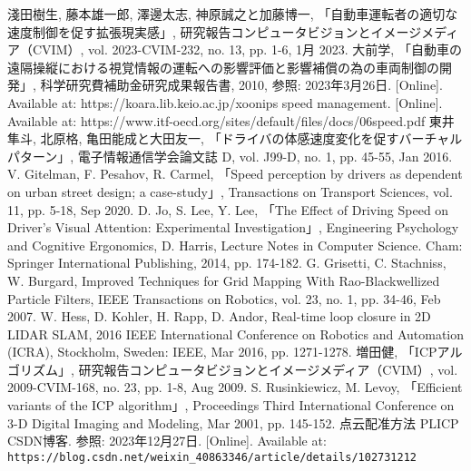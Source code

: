 \documentclass[a4paper,12pt]{jreport}
\begin{document}
\begin{thebibliography}{99}
   淺田樹生, 藤本雄一郎, 澤邊太志, 神原誠之と加藤博一, 「自動車運転者の適切な速度制御を促す拡張現実感」, 研究報告コンピュータビジョンとイメージメディア（CVIM）, vol. 2023-CVIM-232, no. 13, pp. 1-6, 1月 2023.
   大前学, 「自動車の遠隔操縦における視覚情報の運転への影響評価と影響補償の為の車両制御の開発」, 科学研究費補助金研究成果報告書, 2010, 参照: 2023年3月26日. [Online]. Available at: https://koara.lib.keio.ac.jp/xoonips
   speed management. [Online]. Available at: https://www.itf-oecd.org/sites/default/files/docs/06speed.pdf
   東井隼斗, 北原格, 亀田能成と大田友一, 「ドライバの体感速度変化を促すバーチャルパターン」, 電子情報通信学会論文誌 D, vol. J99-D, no. 1, pp. 45-55, Jan 2016.
   V. Gitelman, F. Pesahov, R. Carmel, 「Speed perception by drivers as dependent on urban street design; a case-study」, Transactions on Transport Sciences, vol. 11, pp. 5-18, Sep 2020.
  D. Jo, S. Lee, Y. Lee, 「The Effect of Driving Speed on Driver's Visual Attention: Experimental Investigation」, Engineering Psychology and Cognitive Ergonomics, D. Harris, Lecture Notes in Computer Science. Cham: Springer International Publishing, 2014, pp. 174-182.
  G. Grisetti, C. Stachniss, W. Burgard,  Improved Techniques for Grid Mapping With Rao-Blackwellized Particle Filters, IEEE Transactions on Robotics, vol. 23, no. 1, pp. 34-46, Feb 2007.
  W. Hess, D. Kohler, H. Rapp, D. Andor, Real-time loop closure in 2D LIDAR SLAM, 2016 IEEE International Conference on Robotics and Automation (ICRA), Stockholm, Sweden: IEEE, Mar 2016, pp. 1271-1278.
  増田健, 「ICPアルゴリズム」, 研究報告コンピュータビジョンとイメージメディア（CVIM）, vol. 2009-CVIM-168, no. 23, pp. 1-8, Aug 2009.
  S. Rusinkiewicz, M. Levoy, 「Efficient variants of the ICP algorithm」, Proceedings Third International Conference on 3-D Digital Imaging and Modeling, Mar 2001, pp. 145-152.
  点云配准方法 PLICP CSDN博客. 参照: 2023年12月27日. [Online]. Available at: \verb|https://blog.csdn.net/weixin_40863346/article/details/102731212|
\end{thebibliography}
  
\end{document}
